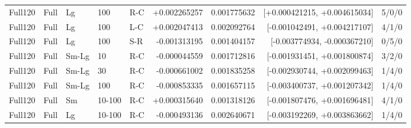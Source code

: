 \begin{longtable}{lllllrrrr}
Full120 & Full & Lg & 100 & R-C & +0.002265257 & 0.001775632 & [+0.000421215, +0.004615034] & 5/0/0 \\
Full120 & Full & Lg & 100 & L-C & +0.002047413 & 0.002092764 & [-0.001042491, +0.004217107] & 4/1/0 \\
Full120 & Full & Lg & 100 & S-R & -0.001313195 & 0.001404157 & [-0.003774934, -0.000367210] & 0/5/0 \\
Full120 & Full & Sm-Lg & 10 & R-C & -0.000044559 & 0.001712816 & [-0.001931451, +0.001800874] & 3/2/0 \\
Full120 & Full & Sm-Lg & 30 & R-C & -0.000661002 & 0.001835258 & [-0.002930744, +0.002099463] & 1/4/0 \\
Full120 & Full & Sm-Lg & 100 & R-C & -0.000853335 & 0.001657115 & [-0.003400737, +0.001207342] & 1/4/0 \\
Full120 & Full & Sm & 10-100 & R-C & +0.000315640 & 0.001318126 & [-0.001807476, +0.001696481] & 4/1/0 \\
Full120 & Full & Lg & 10-100 & R-C & -0.000493136 & 0.002640671 & [-0.003192269, +0.003863662] & 1/4/0 \\
\end{longtable}
\endgroup

